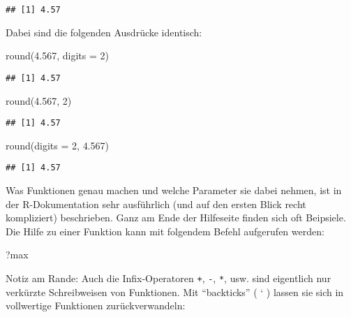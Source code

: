 \documentclass[11pt,german,a4paper]{article}
\newenvironment{Shaded}{\begin{snugshade}}{\end{snugshade}}
\newcommand{\AttributeTok}[1]{\textcolor[rgb]{0.77,0.63,0.00}{#1}}
\newcommand{\DecValTok}[1]{\textcolor[rgb]{0.00,0.00,0.81}{#1}}
\newcommand{\FloatTok}[1]{\textcolor[rgb]{0.00,0.00,0.81}{#1}}
\newcommand{\FunctionTok}[1]{\textcolor[rgb]{0.00,0.00,0.00}{#1}}
\newcommand{\NormalTok}[1]{#1}
\begin{document}
\begin{verbatim}
## [1] 4.57
\end{verbatim}

Dabei sind die folgenden Ausdrücke identisch:

\begin{Shaded}
\begin{Highlighting}[]
\FunctionTok{round}\NormalTok{(}\FloatTok{4.567}\NormalTok{, }\AttributeTok{digits =} \DecValTok{2}\NormalTok{)}
\end{Highlighting}
\end{Shaded}

\begin{verbatim}
## [1] 4.57
\end{verbatim}

\begin{Shaded}
\begin{Highlighting}[]
\FunctionTok{round}\NormalTok{(}\FloatTok{4.567}\NormalTok{, }\DecValTok{2}\NormalTok{)}
\end{Highlighting}
\end{Shaded}

\begin{verbatim}
## [1] 4.57
\end{verbatim}

\begin{Shaded}
\begin{Highlighting}[]
\FunctionTok{round}\NormalTok{(}\AttributeTok{digits =} \DecValTok{2}\NormalTok{, }\FloatTok{4.567}\NormalTok{)}
\end{Highlighting}
\end{Shaded}

\begin{verbatim}
## [1] 4.57
\end{verbatim}

Was Funktionen genau machen und welche Parameter sie dabei nehmen, ist in der R-Dokumentation sehr ausführlich (und auf den ersten Blick recht kompliziert) beschrieben. Ganz am Ende der Hilfeseite finden sich oft Beipsiele. Die Hilfe zu einer Funktion kann mit folgendem Befehl aufgerufen werden:

\begin{Shaded}
\begin{Highlighting}[]
\NormalTok{?max}
\end{Highlighting}
\end{Shaded}

Notiz am Rande: Auch die Infix-Operatoren \texttt{+}, \texttt{-}, \texttt{*}, usw. sind eigentlich nur verkürzte Schreibweisen von Funktionen. Mit ``backticks'' ( ` ) lassen sie sich in vollwertige Funktionen zurückverwandeln:
\end{document}
